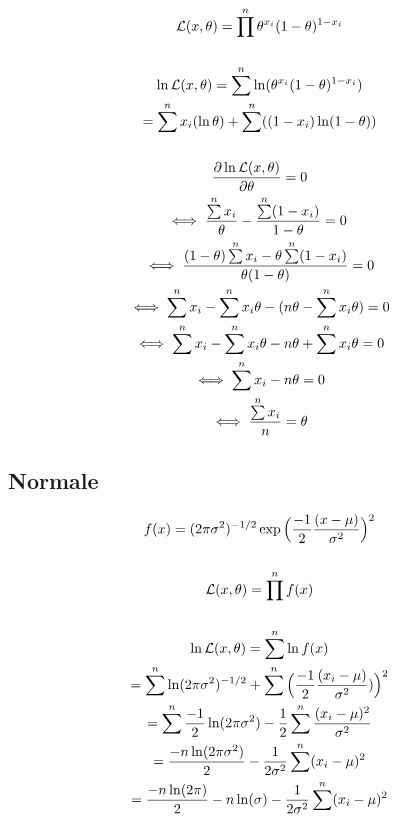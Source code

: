 \documentclass{article}
\begin{document}
\begin{gather*}
    \likelihood(x, \theta) = \prod\limits^n \theta^{x_i}(1 - \theta)^{1 - x_i} \\ \\
    \ln \likelihood(x, \theta) = \sum\limits^n \ln(\theta^{x_i}(1 - \theta)^{1 - x_i}) \\
    = \sum\limits^n x_i (\ln\theta) + \sum\limits^n ((1-x_i) \ln(1-\theta)) \\ \\
    \frac{\partial \ln \likelihood(x, \theta)}{\partial \theta} = 0 \\
    \iff \frac{\sum\limits^n x_i}{\theta} - \frac{\sum\limits^n (1-x_i)}{1 - \theta} = 0 \\
    \iff \frac{(1 - \theta) \sum\limits^n x_i - \theta \sum\limits^n (1 - x_i)}{\theta (1 - \theta)} = 0 \\
    \iff \sum\limits^n x_i - \sum\limits^n x_i \theta - (n\theta - \sum\limits^n x_i\theta) = 0 \\
    \iff \sum\limits^n x_i - \sum\limits^n x_i \theta -  n\theta + \sum\limits^n x_i\theta  = 0 \\
    \iff \sum\limits^n x_i - n\theta = 0 \\
    \iff \frac{\sum\limits^n x_i}{n} = \theta
\end{gather*}

\subsection{Normale}

\begin{gather*}
        f(x) = (2 \pi \sigma^2)^{-1/2} \exp\Big(\frac{-1}{2} \frac{(x-\mu)}{\sigma^2}\Big)^2 \\ \\
        {\cal L}(x, \theta) = \prod\limits^n f(x) \\ \\
        \ln{\cal L}(x, \theta) = \sum\limits^n \ln f(x) \\
        = \sum\limits^n \ln(2 \pi \sigma^2)^{-1/2} + \sum\limits^n \Big(\frac{-1}{2} \frac{(x_i-\mu)}{\sigma^2})\Big)^2 \\
        = \sum\limits^n \frac{- 1}{2} \ln(2 \pi \sigma^2) - \frac{1}{2} \sum\limits^n \frac{(x_i -\mu)^2}{\sigma^2} \\
        = \frac{-n \ln(2 \pi \sigma^2)}{2} - \frac{1}{2 \sigma^2} \sum\limits^n (x_i - \mu)^2 \\
        = \frac{-n \ln(2 \pi)}{2} - {n \ln(\sigma)} - \frac{1}{2 \sigma^2} \sum\limits^n (x_i - \mu)^2
\end{gather*}
\end{document}

